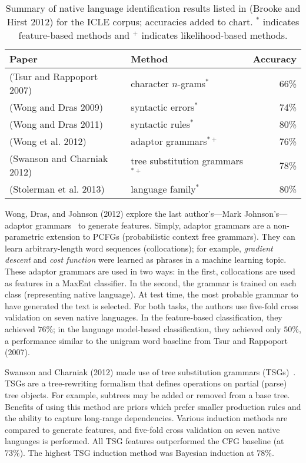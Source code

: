 \begin{table}[t]
  \begin{center}
    \begin{tabular}{llr}
        \hline
        \hline
        \textbf{Paper} & \textbf{Method} & \textbf{Accuracy} \\
        \hline
        (Tsur and Rappoport 2007) & character $n$-grams$^*$ & 66\% \\
        (Wong and Dras 2009) & syntactic errors$^*$ & 74\% \\
        (Wong and Dras 2011) & syntactic rules$^*$ & 80\% \\
        (Wong et al. 2012) & adaptor grammars$^{*+}$ & 76\% \\
        (Swanson and Charniak 2012) & tree substitution grammars$^{*+}$ & 78\%\\
        (Stolerman et al. 2013) & language family$^*$ & 80\%
        \\
        \hline
        \hline
    \end{tabular}
  \end{center}
    \caption{Summary of native language identification results listed in (Brooke
    and Hirst 2012) for the ICLE corpus; accuracies added to chart. $^*$
indicates feature-based methods and $^+$ indicates likelihood-based methods.}
    \label{table:nli-comp}
\end{table}

Wong, Dras, and Johnson (2012) explore the last author's---Mark Johnson's---adaptor
grammars~\cite{adaptor-grammars} to generate features. Simply, adaptor
grammars are a non-parametric extension to PCFGs (probabilistic context free
grammars). They can learn arbitrary-length word sequences (collocations); for
example, \emph{gradient descent} and \emph{cost function} were learned as
phrases in a machine learning topic. These adaptor grammars are used in two
ways: in the first, collocations are used as features in a MaxEnt classifier. In
the second, the grammar is trained on each class (representing native language).
At test time, the most probable grammar to have generated the text is selected.
For both tasks, the authors use five-fold cross validation on seven native
languages. In the feature-based classification, they achieved $76\%$; in the
language model-based classification, they achieved only $50\%$, a performance
similar to the unigram word baseline from Tsur and Rappoport (2007).

Swanson and Charniak (2012) made use of tree substitution grammars (TSGs)~\cite{tsgs}. TSGs are a tree-rewriting formalism that defines operations on
partial (parse) tree objects. For example, subtrees may be added or removed from
a base tree. Benefits of using this method are priors which prefer smaller
production rules and the ability to capture long-range dependencies. Various
induction methods are compared to generate features, and five-fold cross
validation on seven native languages is performed. All TSG features outperformed
the CFG baseline (at $73\%$). The highest TSG induction method was Bayesian
induction at $78\%$.

